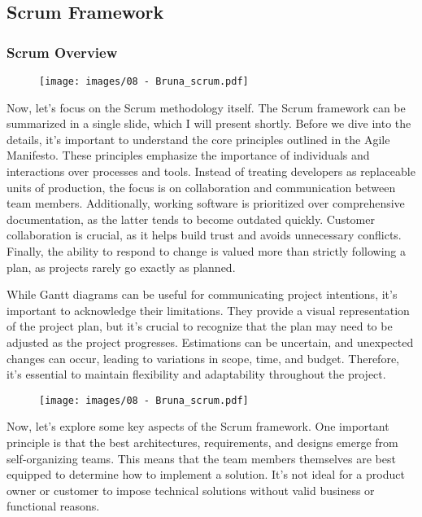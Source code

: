 \subsection{Scrum Framework}

\subsubsection{Scrum Overview}

\begin{figure}[!h]
    \centering
    \texttt{[image: images/08 - Bruna\_scrum.pdf]}
\end{figure}

Now, let's focus on the Scrum methodology itself. The Scrum framework
can be summarized in a single slide, which I will present shortly.
Before we dive into the details, it's important to understand the core
principles outlined in the Agile Manifesto. These principles emphasize
the importance of individuals and interactions over processes and tools.
Instead of treating developers as replaceable units of production, the
focus is on collaboration and communication between team members.
Additionally, working software is prioritized over comprehensive
documentation, as the latter tends to become outdated quickly. Customer
collaboration is crucial, as it helps build trust and avoids unnecessary
conflicts. Finally, the ability to respond to change is valued more than
strictly following a plan, as projects rarely go exactly as planned.

While Gantt diagrams can be useful for communicating project intentions,
it's important to acknowledge their limitations. They provide a visual
representation of the project plan, but it's crucial to recognize that
the plan may need to be adjusted as the project progresses. Estimations
can be uncertain, and unexpected changes can occur, leading to
variations in scope, time, and budget. Therefore, it's essential to
maintain flexibility and adaptability throughout the project.

\begin{figure}[!h]
    \centering
    \texttt{[image: images/08 - Bruna\_scrum.pdf]}
\end{figure}

Now, let's explore some key aspects of the Scrum framework. One
important principle is that the best architectures, requirements, and
designs emerge from self-organizing teams. This means that the team
members themselves are best equipped to determine how to implement a
solution. It's not ideal for a product owner or customer to impose
technical solutions without valid business or functional reasons.

